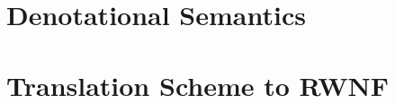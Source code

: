 \documentclass{article}[11pt]
\begin{document}
\section{Denotational Semantics}

\section{Translation Scheme to RWNF}
\end{document}
